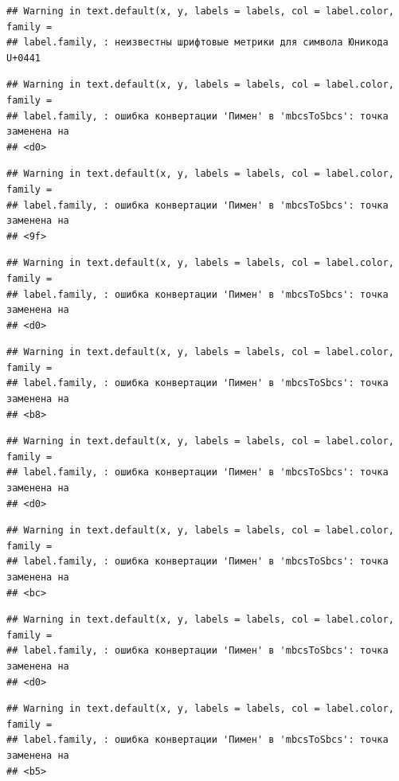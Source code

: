 \documentclass[]{book}
\begin{document}
\begin{verbatim}
## Warning in text.default(x, y, labels = labels, col = label.color, family =
## label.family, : неизвестны шрифтовые метрики для символа Юникода U+0441
\end{verbatim}

\begin{verbatim}
## Warning in text.default(x, y, labels = labels, col = label.color, family =
## label.family, : ошибка конвертации 'Пимен' в 'mbcsToSbcs': точка заменена на
## <d0>
\end{verbatim}

\begin{verbatim}
## Warning in text.default(x, y, labels = labels, col = label.color, family =
## label.family, : ошибка конвертации 'Пимен' в 'mbcsToSbcs': точка заменена на
## <9f>
\end{verbatim}

\begin{verbatim}
## Warning in text.default(x, y, labels = labels, col = label.color, family =
## label.family, : ошибка конвертации 'Пимен' в 'mbcsToSbcs': точка заменена на
## <d0>
\end{verbatim}

\begin{verbatim}
## Warning in text.default(x, y, labels = labels, col = label.color, family =
## label.family, : ошибка конвертации 'Пимен' в 'mbcsToSbcs': точка заменена на
## <b8>
\end{verbatim}

\begin{verbatim}
## Warning in text.default(x, y, labels = labels, col = label.color, family =
## label.family, : ошибка конвертации 'Пимен' в 'mbcsToSbcs': точка заменена на
## <d0>
\end{verbatim}

\begin{verbatim}
## Warning in text.default(x, y, labels = labels, col = label.color, family =
## label.family, : ошибка конвертации 'Пимен' в 'mbcsToSbcs': точка заменена на
## <bc>
\end{verbatim}

\begin{verbatim}
## Warning in text.default(x, y, labels = labels, col = label.color, family =
## label.family, : ошибка конвертации 'Пимен' в 'mbcsToSbcs': точка заменена на
## <d0>
\end{verbatim}

\begin{verbatim}
## Warning in text.default(x, y, labels = labels, col = label.color, family =
## label.family, : ошибка конвертации 'Пимен' в 'mbcsToSbcs': точка заменена на
## <b5>
\end{verbatim}
\end{document}
